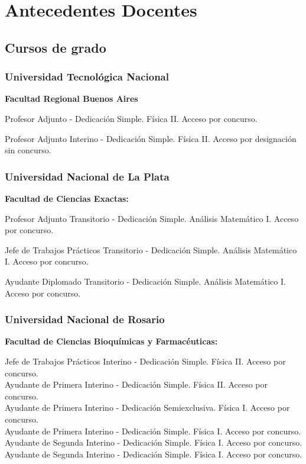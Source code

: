 \section{Antecedentes Docentes}

\subsection{Cursos de grado}

\subsubsection{Universidad Tecnológica Nacional}
\textbf{Facultad Regional Buenos Aires}

 Profesor Adjunto - Dedicación Simple. Física II. Acceso por concurso.

 Profesor Adjunto Interino - Dedicación Simple. Física II. Acceso por designación sin concurso.

\subsubsection{Universidad Nacional de La Plata}
  
\textbf{Facultad de Ciencias Exactas:}
 
 Profesor Adjunto Transitorio - Dedicación Simple. Análisis Matemático I. Acceso por concurso.

 Jefe de Trabajos Prácticos Transitorio - Dedicación Simple. Análisis Matemático I. Acceso por concurso.

 Ayudante Diplomado Transitorio - Dedicación Simple. Análisis Matemático I. Acceso por concurso.

\subsubsection{Universidad Nacional de Rosario}
  
\textbf{Facultad de Ciencias Bioquímicas y Farmacéuticas:} 

 Jefe de Trabajos Prácticos Interino - Dedicación Simple. Física II. Acceso por concurso.\\
 Ayudante de Primera Interino - Dedicación Simple. Física II. Acceso por concurso. \\
 Ayudante de Primera Interino - Dedicación Semiexclusiva. Física I. Acceso por concurso. \\
 Ayudante de Primera Interino - Dedicación Simple. Física I. Acceso por concurso. \\
 Ayudante de Segunda Interino - Dedicación Simple. Física I. Acceso por concurso. \\
 Ayudante de Segunda Interino - Dedicación Simple. Física I. Acceso por concurso. \\

